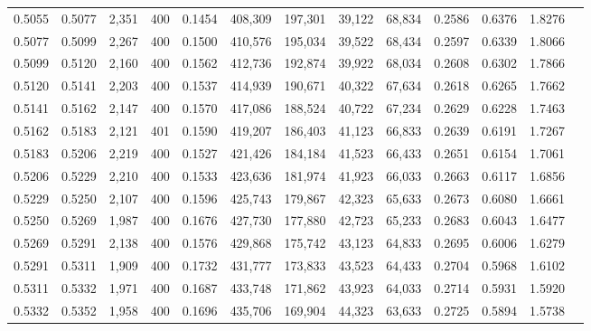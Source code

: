 \begin{tabular}{rrrrrrrrrrrrr}
0.5055 & 0.5077 &  2,351 & 400 &                                     0.1454 & 408,309 & 197,301 &  39,122 &  68,834 & 0.2586 & 0.6376 & 1.8276 \\
0.5077 & 0.5099 &  2,267 & 400 &                                     0.1500 & 410,576 & 195,034 &  39,522 &  68,434 & 0.2597 & 0.6339 & 1.8066 \\
0.5099 & 0.5120 &  2,160 & 400 &                                     0.1562 & 412,736 & 192,874 &  39,922 &  68,034 & 0.2608 & 0.6302 & 1.7866 \\
0.5120 & 0.5141 &  2,203 & 400 &                                     0.1537 & 414,939 & 190,671 &  40,322 &  67,634 & 0.2618 & 0.6265 & 1.7662 \\
0.5141 & 0.5162 &  2,147 & 400 &                                     0.1570 & 417,086 & 188,524 &  40,722 &  67,234 & 0.2629 & 0.6228 & 1.7463 \\
0.5162 & 0.5183 &  2,121 & 401 &                                     0.1590 & 419,207 & 186,403 &  41,123 &  66,833 & 0.2639 & 0.6191 & 1.7267 \\
0.5183 & 0.5206 &  2,219 & 400 &                                     0.1527 & 421,426 & 184,184 &  41,523 &  66,433 & 0.2651 & 0.6154 & 1.7061 \\
0.5206 & 0.5229 &  2,210 & 400 &                                     0.1533 & 423,636 & 181,974 &  41,923 &  66,033 & 0.2663 & 0.6117 & 1.6856 \\
0.5229 & 0.5250 &  2,107 & 400 &                                     0.1596 & 425,743 & 179,867 &  42,323 &  65,633 & 0.2673 & 0.6080 & 1.6661 \\
0.5250 & 0.5269 &  1,987 & 400 &                                     0.1676 & 427,730 & 177,880 &  42,723 &  65,233 & 0.2683 & 0.6043 & 1.6477 \\
0.5269 & 0.5291 &  2,138 & 400 &                                     0.1576 & 429,868 & 175,742 &  43,123 &  64,833 & 0.2695 & 0.6006 & 1.6279 \\
0.5291 & 0.5311 &  1,909 & 400 &                                     0.1732 & 431,777 & 173,833 &  43,523 &  64,433 & 0.2704 & 0.5968 & 1.6102 \\
0.5311 & 0.5332 &  1,971 & 400 &                                     0.1687 & 433,748 & 171,862 &  43,923 &  64,033 & 0.2714 & 0.5931 & 1.5920 \\
0.5332 & 0.5352 &  1,958 & 400 &                                     0.1696 & 435,706 & 169,904 &  44,323 &  63,633 & 0.2725 & 0.5894 & 1.5738 \\

\end{tabular}
